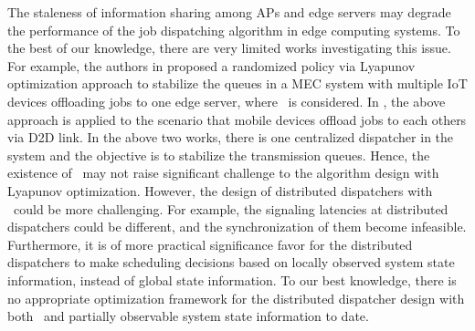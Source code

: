 The staleness of information sharing among APs and edge servers may degrade the performance of the job dispatching algorithm in edge computing systems.
To the best of our knowledge, there are very limited works investigating this issue.
For example, the authors in \cite{JSAC17-LyuX} proposed a randomized policy via Lyapunov optimization approach to stabilize the queues in a MEC system with multiple IoT devices offloading jobs to one edge server, where \brlatency~is considered. 
In \cite{TWC18-LyuX}, the above approach is applied to the scenario that mobile devices offload jobs to each others via D2D link.
In the above two works, there is one centralized dispatcher in the system and the objective is to stabilize the transmission queues.
Hence, the existence of \brlatency~may not raise significant challenge to the algorithm design with Lyapunov optimization.
However, the design of distributed dispatchers with \brlatency~could be more challenging.
For example, the signaling latencies at distributed dispatchers could be different, and the synchronization of them become infeasible.
Furthermore, it is of more practical significance favor for the distributed dispatchers to make scheduling decisions based on locally observed system state information, instead of global state information.
To our best knowledge, there is no appropriate optimization framework for the distributed dispatcher design with both \brlatency~and partially observable system state information to date.

